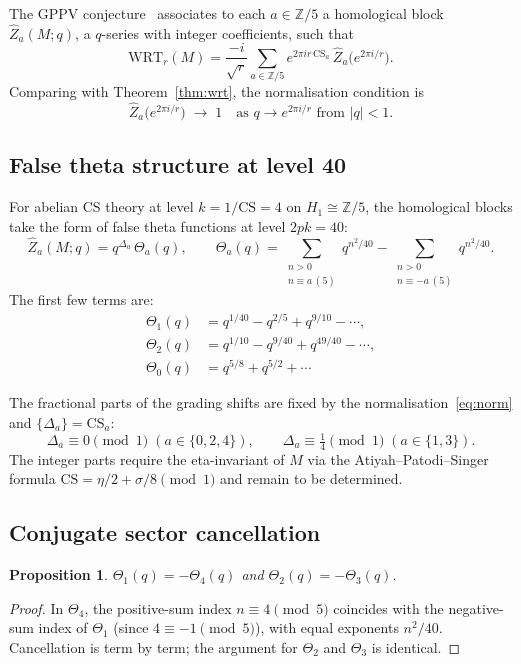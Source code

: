 \documentclass[11pt,a4paper]{article}
\newtheorem{proposition}{Proposition}
\theoremstyle{definition}
\theoremstyle{remark}
\newcommand{\Z}{\mathbb{Z}}
\newcommand{\CS}{\mathrm{CS}}
\newcommand{\WRT}{\mathrm{WRT}}
\begin{document}
The GPPV conjecture~\cite{GPPV} associates to each $a\in\Z/5$ a
homological block $\hat Z_a(M;q)$, a $q$-series with integer
coefficients, such that
\begin{equation}\label{eq:GPPV}
\WRT_r(M)=\frac{-i}{\sqrt{r}}\sum_{a\in\Z/5}
e^{2\pi ir\,\CS_a}\,\hat Z_a\!\bigl(e^{2\pi i/r}\bigr).
\end{equation}
Comparing with Theorem~\ref{thm:wrt}, the normalisation condition is
\begin{equation}\label{eq:norm}
\hat Z_a\!\bigl(e^{2\pi i/r}\bigr)\;\longrightarrow\;1
\quad\text{as }q\to e^{2\pi i/r}\text{ from }|q|<1.
\end{equation}

\subsection{False theta structure at level 40}

For abelian CS theory at level $k=1/\CS=4$ on $H_1\cong\Z/5$,
the homological blocks take the form of false theta functions
at level $2pk=40$:
\begin{equation}\label{eq:blocks}
\hat Z_a(M;q)
= q^{\Delta_a}\,\Theta_a(q),
\qquad
\Theta_a(q)
= \sum_{\substack{n>0\\n\equiv a\,(5)}}q^{n^2/40}
- \sum_{\substack{n>0\\n\equiv{-a}\,(5)}}q^{n^2/40}.
\end{equation}
The first few terms are:
\begin{align*}
\Theta_1(q)&=q^{1/40}-q^{2/5}+q^{9/10}-\cdots,\\
\Theta_2(q)&=q^{1/10}-q^{9/40}+q^{49/40}-\cdots,\\
\Theta_0(q)&=q^{5/8}+q^{5/2}+\cdots
\end{align*}

The fractional parts of the grading shifts are fixed by
the normalisation~\eqref{eq:norm} and $\{\Delta_a\}=\CS_a$:
\[
\Delta_a\equiv 0\pmod1\;(a\in\{0,2,4\}),\qquad
\Delta_a\equiv\tfrac14\pmod1\;(a\in\{1,3\}).
\]
The integer parts require the eta-invariant of $M$ via the
Atiyah--Patodi--Singer formula $\CS=\eta/2+\sigma/8\pmod1$
and remain to be determined.

\subsection{Conjugate sector cancellation}

\begin{proposition}\label{prop:cancel}
$\Theta_1(q)=-\Theta_4(q)$ and $\Theta_2(q)=-\Theta_3(q)$.
\end{proposition}
\begin{proof}
In $\Theta_4$, the positive-sum index $n\equiv4\pmod5$
coincides with the negative-sum index of $\Theta_1$
(since $4\equiv-1\pmod5$), with equal exponents $n^2/40$.
Cancellation is term by term; the argument for $\Theta_2$
and $\Theta_3$ is identical.
\end{proof}
\end{document}

